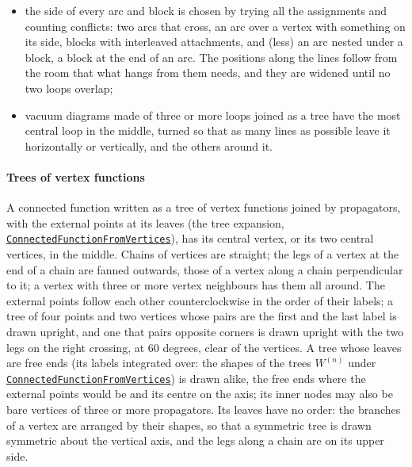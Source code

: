 \documentclass[11pt,a4paper]{article}
\newcommand{\pkg}[1]{\texttt{#1}}
\newcommand{\fnref}[1]{\hyperref[fn:#1]{\pkg{#1}}}
\begin{document}
\begin{itemize}
\item the side of every arc and block is chosen by trying all the assignments and counting conflicts: two arcs that cross,
  an arc over a vertex with something on its side, blocks with interleaved attachments, and (less) an arc nested under a
  block, a block at the end of an arc. The positions along the lines follow from the room that what hangs from them needs,
  and they are widened until no two loops overlap;
\item vacuum diagrams made of three or more loops joined as a tree have the most central loop in the middle, turned so
  that as many lines as possible leave it horizontally or vertically, and the others around it.
\end{itemize}

\paragraph{Trees of vertex functions} A connected function written as a tree of vertex functions joined by propagators,
with the external points at its leaves (the tree expansion, \fnref{ConnectedFunctionFromVertices}), has its central vertex,
or its two central vertices, in the middle. Chains of vertices are straight; the legs of a vertex at the end of a chain
are fanned outwards, those of a vertex along a chain perpendicular to it; a vertex with three or more vertex neighbours
has them all around. The external points follow each other counterclockwise in the order of their labels; a tree of
four points and two vertices whose pairs are the first and the last label is drawn upright, and one that pairs opposite
corners is drawn upright with the two legs on the right crossing, at 60 degrees, clear of the vertices. A tree whose
leaves are free ends (its labels integrated over: the shapes of the trees $W^{(n)}$ under \fnref{ConnectedFunctionFromVertices}) is drawn
alike, the free ends where the external points would be and its centre on the axis; its inner nodes may also be bare
vertices of three or more propagators. Its leaves have no order: the branches of a vertex are arranged by their shapes,
so that a symmetric tree is drawn symmetric about the vertical axis, and the legs along a chain are on its upper side.
\end{document}
